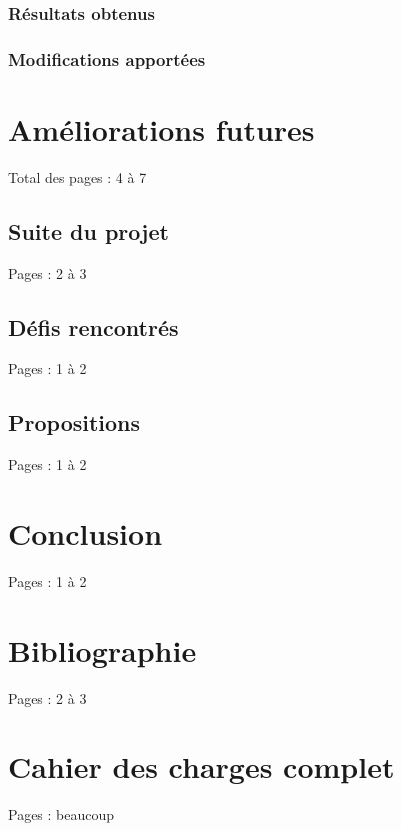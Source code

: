\documentclass{eplmastersthesis_FR}
\begin{document}
			\subsection*{Résultats obtenus}
			\subsection*{Modifications apportées}

	\chapter{Améliorations futures}

		Total des pages : 4 à 7

		\section{Suite du projet}

			Pages : 2 à 3

		\section{Défis rencontrés}

			Pages : 1 à 2

		\section{Propositions}

			Pages : 1 à 2

	\chapter{Conclusion}

		Pages : 1 à 2

	\chapter*{Bibliographie}

	{}
	

		Pages : 2 à 3

	\appendix

	\chapter{Cahier des charges complet}

		Pages : beaucoup
\end{document}
